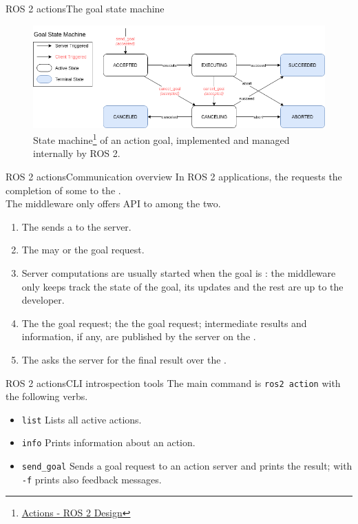 \begin{frame}{ROS 2 actions}{The goal state machine}
  \begin{figure}
    \centering
    \includegraphics[width=\textwidth]{goalStateMachine.png}
    \caption{State machine\footnote{\href{http://design.ros2.org/articles/actions.html}{\color{blue}\underline{Actions - ROS 2 Design}}} of an action goal, implemented and managed internally by ROS 2.}
    \label{fig:goalStateMachine}
  \end{figure}
\end{frame}
\begin{frame}{ROS 2 actions}{Communication overview}
  In ROS 2 applications, the  requests the completion of some  to the .\\
  The middleware only offers API to  among the two.
  \begin{enumerate}
    \item The  sends a  to the server.
    \item The  may  or  the goal request.
    \item Server computations are usually started when the goal is : the middleware only keeps track the state of the goal, its updates and the rest are up to the developer.
    \item The  the goal request; the  the goal request; intermediate results and information, if any, are published by the server on the .
    \item The  asks the server for the final result over the .
  \end{enumerate}
\end{frame}
\begin{frame}{ROS 2 actions}{CLI introspection tools}
  The main command is \texttt{ros2 action} with the following verbs.
  \begin{itemize}
    \item \texttt{list} Lists all active actions.
    \item \texttt{info} Prints information about an action.
    \item \texttt{send\_goal} Sends a goal request to an action server and prints the result; with \texttt{-f} prints also feedback messages.
  \end{itemize}
\end{frame}

